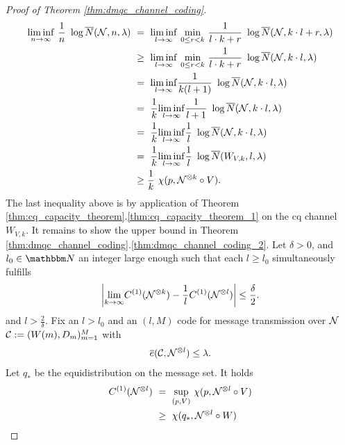 \begin{proof}[Proof of Theorem \ref{thm:dmqc_channel_coding}]
\begin{align*}
       \underset{n \rightarrow \infty}{\liminf} \ \frac{1}{n} \ \log \overline{N}(\cN, n , \lambda) 
       \ &= \ \underset{l \rightarrow \infty}{\liminf} \ \underset{0 \leq r < k}{\min} \ \frac{1}{l \cdot k + r} \ \log \overline{N}(\cN, k \cdot l + r , \lambda)  \\
       \ &\geq \ \underset{l \rightarrow \infty}{\liminf} \ \underset{0 \leq r < k}{\min} \ \frac{1}{l \cdot k + r} \ \log \overline{N}(\cN, k \cdot l , \lambda)    \\
       \ &= \ \underset{l \rightarrow \infty}{\liminf}  \frac{1}{k (l+ 1)} \ \log \overline{N}(\cN, k \cdot l , \lambda)    \\
       \ &= \ \frac{1}{k} \underset{l \rightarrow \infty}{\liminf}  \frac{1}{l+ 1} \ \log \overline{N}(\cN, k \cdot l , \lambda) \\   
       \ &= \ \frac{1}{k} \underset{l \rightarrow \infty}{\liminf}  \frac{1}{l} \ \log \overline{N}(\cN, k \cdot l , \lambda)   \\
       \ &= \ \frac{1}{k} \underset{l \rightarrow \infty}{\liminf}  \frac{1}{l} \ \log \overline{N}(W_{V,k}, l , \lambda) \\
       \ &\geq \frac{1}{k} \ \chi(p, \cN^{\otimes k} \circ V).
       \end{align*}
       The last inequality above is by application of Theorem \ref{thm:cq_capacity_theorem}.\ref{thm:cq_capacity_theorem_1} on the cq channel $W_{V,k}$. It remains to show the upper bound in Theorem 
       \ref{thm:dmqc_channel_coding}.\ref{thm:dmqc_channel_coding_2}. Let $\delta > 0$, and $l_0 \in \bbmN$ an integer large enough such that each $l \geq l_0$ simultaneously fulfills
       \begin{align}
        \left|\underset{k \rightarrow \infty}{\lim} C^{(1)}({\mathcal N}^{\otimes k}) - \frac{1}{l} C^{(1)}({\mathcal N}^{\otimes l})\right| \leq \frac{\delta}{2}.
       \end{align}
       and $l > \frac{2}{\delta}$. Fix an $l > l_0$ and an $(l,M)$ code for message transmission over ${\mathcal N}$ ${\mathcal C} := (W(m),D_m)_{m =1}^M$ with   
       \begin{align*}
        \overline{e}({\mathcal C}, {\mathcal N}^{\otimes l}) \leq \lambda.
       \end{align*}
       Let $q_\ast$ be the equidistribution on the message set. It holds 
       \begin{align*}
        C^{(1)}(\cN^{\otimes l}) 
        \ & = \ \underset{(p,V)}{\sup} \ \chi(p, \cN^{\otimes l} \circ V) \\
        \ & \geq \ \chi(q_{\ast}, \cN^{\otimes l} \circ W) \\

\end{align*}
\end{proof}
